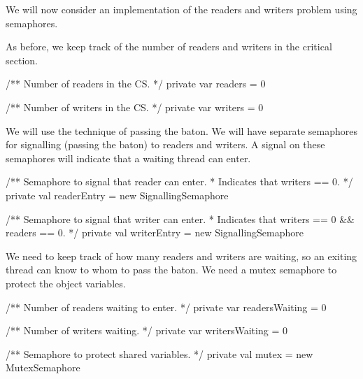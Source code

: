 




\begin{slide}

We will now consider an implementation of the readers and writers problem
using semaphores. 

As before, we keep track of the number of readers and writers in the
critical section.
\begin{scala}
  /** Number of readers in the CS. */
  private var readers = 0 

  /** Number of writers in the CS. */
  private var writers = 0 
\end{scala}
\end{slide}


\begin{slide}

We will use the technique of passing the baton.  We will have separate
semaphores for signalling (passing the baton) to readers and writers.  A
signal on these semaphores will indicate that a waiting thread can enter. 

\begin{scala}
  /** Semaphore to signal that reader can enter.
    * Indicates that writers == 0. */
  private val readerEntry = new SignallingSemaphore

  /** Semaphore to signal that writer can enter.
    * Indicates that writers == 0 && readers == 0. */
  private val writerEntry = new SignallingSemaphore
\end{scala}
\end{slide}


\begin{slide}

We need to keep track of how many readers and writers are waiting, so an
exiting thread can know to whom to pass the baton.  We need a mutex semaphore
to protect the object variables.
%
\begin{scala}
  /** Number of readers waiting to enter. */
  private var readersWaiting = 0

  /** Number of writers waiting. */
  private var writersWaiting = 0

  /** Semaphore to protect shared variables. */
  private val mutex = new MutexSemaphore
\end{scala}
\end{slide}

